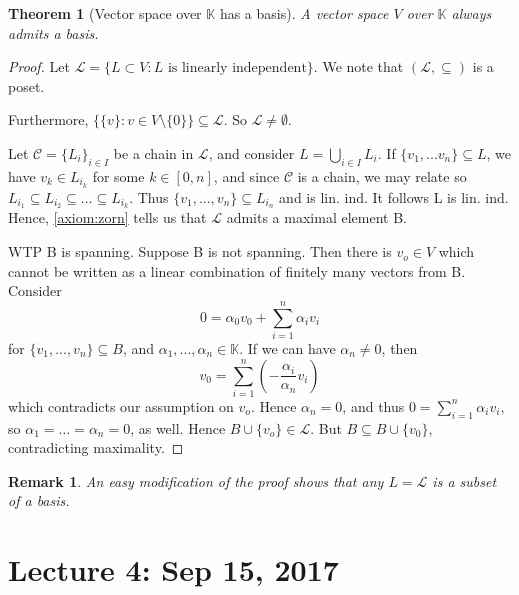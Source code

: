 \documentclass[11pt, oneside]{book}
\theoremstyle{break}
\newtheorem{thm}{Theorem}[section]
\newtheorem*{proof}{Proof}
\newtheorem*{remark}{Remark}
\newcommand{\bb}[1]{\mathbb{#1}}			%
\begin{document}
\begin{thm}[Vector space over $\bb{K}$ has a basis]
	A vector space $V$ over $\bb{K}$ always admits a basis.
\end{thm}

\begin{proof}
	Let $\mathcal{L} = \{L \subset V: L \text{ is linearly independent\}}$. We note that $(\mathcal{L}, \subseteq)$ is a poset.

	Furthermore, $\big\{ \{v\} : v \in V \setminus \{0\} \big\} \subseteq \mathcal{L}$. So $\mathcal{L} \neq \emptyset$.

	Let $\mathcal{C} = \{L_i\}_{i \in I}$ be a chain in $\mathcal{L}$, and consider $L = \bigcup_{i \in I} L_i$. If $\{v_1, ... v_n\} \subseteq L$, we have $v_k \in L_{i_k}$ for some $k \in [0, n]$, and since $\mathcal{C}$ is a chain, we may relate so $L_{i_1} \subseteq L_{i_2} \subseteq \hdots \subseteq L_{i_k}$. Thus $\{v_1, ..., v_n\} \subseteq L_{i_n}$ and is lin. ind. It follows L is lin. ind. Hence, \autoref{axiom:zorn} tells us that $\mathcal{L}$ admits a maximal element B.

	WTP B is spanning. Suppose B is not spanning. Then there is $v_o \in V$ which cannot be written as a linear combination of finitely many vectors from B. Consider
	\begin{equation}
		0 = \alpha_0 v_0 + \sum_{i=1}^{n} \alpha_i v_i
	\end{equation}
	for $\{v_1, ..., v_n\} \subseteq B$, and $\alpha_1, ..., \alpha_n \in \bb{K}$. If we can have $\alpha_n \neq 0$, then
	\begin{equation}
		v_0 = \sum_{i=1}^{n} \left(-\frac{\alpha_i}{\alpha_n} v_i\right)
	\end{equation}
	which contradicts our assumption on $v_o$. Hence $\alpha_n = 0$, and thus $0 = \sum_{i=1}^{n} \alpha_i v_i$, so $\alpha_1 = \hdots = \alpha_n = 0$, as well. Hence $B \cup \{v_o\} \in \mathcal{L}$. But $B \subseteq B \cup \{v_0\}$, contradicting maximality.
\end{proof}

\begin{remark}
	An easy modification of the proof shows that any $L = \mathcal{L}$ is a subset of a basis.
\end{remark}

\chapter{Lecture 4: Sep 15, 2017}\label{chp:lec4}
\end{document}
